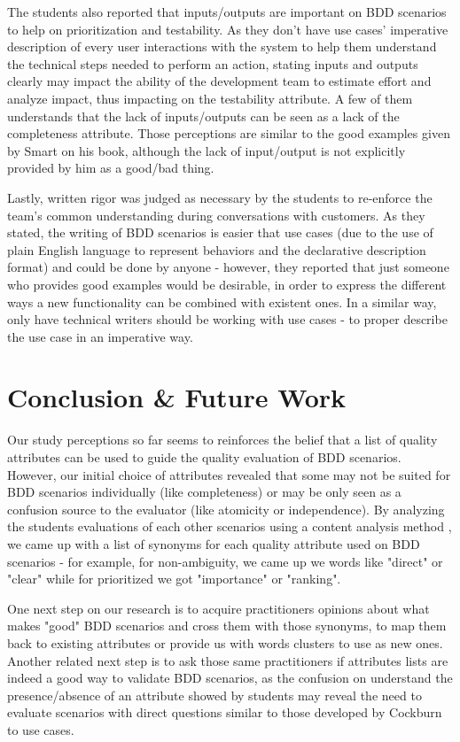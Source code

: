 The students also reported that inputs/outputs are important on BDD scenarios to help on prioritization and testability. As they don't have use cases' imperative description of every user interactions with the system to help them understand the technical steps needed to perform an action, stating inputs and outputs clearly may impact the ability of the development team to estimate effort and analyze impact, thus impacting on the testability attribute. A few of them understands that the lack of inputs/outputs can be seen as a lack of the completeness attribute. Those perceptions are similar to the good examples given by Smart \cite{Smart_2014} on his book, although the lack of input/output is not explicitly provided by him as a good/bad thing.

Lastly, written rigor was judged as necessary by the students to re-enforce the team's common understanding during conversations with customers. As they stated, the writing of BDD scenarios is easier that use cases (due to the use of plain English language to represent behaviors and the declarative description format) and could be done by anyone - however, they reported that just someone who provides good examples would be desirable, in order to express the different ways a new functionality can be combined with existent ones. In a similar way, only have technical writers should be working with use cases - to proper describe the use case in an imperative way.

\section{Conclusion \& Future Work}

Our study perceptions so far seems to reinforces the belief that a list of quality attributes can be used to guide the quality evaluation of BDD scenarios. However, our initial choice of attributes revealed that some may not be suited for BDD scenarios individually (like completeness) or may be only seen as a confusion source to the evaluator (like atomicity or independence). By analyzing the students evaluations of each other scenarios using a content analysis method \cite{White_Marsh_2006}, we came up with a list of synonyms for each quality attribute used on BDD scenarios - for example, for non-ambiguity, we came up we words like "direct" or "clear" while for prioritized we got "importance" or "ranking". 

One next step on our research is to acquire practitioners opinions about what makes "good" BDD scenarios and cross them with those synonyms, to map them back to existing attributes or provide us with words clusters to use as new ones. Another related next step is to ask those same practitioners if attributes lists are indeed a good way to validate BDD scenarios, as the confusion on understand the presence/absence of an attribute showed by students may reveal the need to evaluate scenarios with direct questions similar to those developed by Cockburn \cite{Cockburn_2000} to use cases.